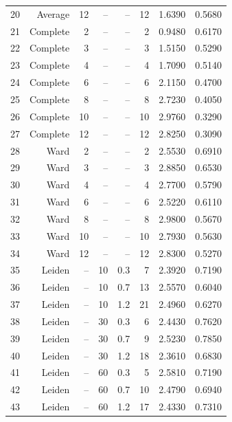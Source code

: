 \begin{longtable}{lrrrrrrr}
20 & Average & 12 & -- & -- & 12 & 1.6390 & 0.5680 \\
21 & Complete & 2 & -- & -- & 2 & 0.9480 & 0.6170 \\
22 & Complete & 3 & -- & -- & 3 & 1.5150 & 0.5290 \\
23 & Complete & 4 & -- & -- & 4 & 1.7090 & 0.5140 \\
24 & Complete & 6 & -- & -- & 6 & 2.1150 & 0.4700 \\
25 & Complete & 8 & -- & -- & 8 & 2.7230 & 0.4050 \\
26 & Complete & 10 & -- & -- & 10 & 2.9760 & 0.3290 \\
27 & Complete & 12 & -- & -- & 12 & 2.8250 & 0.3090 \\
28 & Ward & 2 & -- & -- & 2 & 2.5530 & 0.6910 \\
29 & Ward & 3 & -- & -- & 3 & 2.8850 & 0.6530 \\
30 & Ward & 4 & -- & -- & 4 & 2.7700 & 0.5790 \\
31 & Ward & 6 & -- & -- & 6 & 2.5220 & 0.6110 \\
32 & Ward & 8 & -- & -- & 8 & 2.9800 & 0.5670 \\
33 & Ward & 10 & -- & -- & 10 & 2.7930 & 0.5630 \\
34 & Ward & 12 & -- & -- & 12 & 2.8300 & 0.5270 \\
35 & Leiden & -- & 10 & 0.3 & 7 & 2.3920 & 0.7190 \\
36 & Leiden & -- & 10 & 0.7 & 13 & 2.5570 & 0.6040 \\
37 & Leiden & -- & 10 & 1.2 & 21 & 2.4960 & 0.6270 \\
38 & Leiden & -- & 30 & 0.3 & 6 & 2.4430 & 0.7620 \\
39 & Leiden & -- & 30 & 0.7 & 9 & 2.5230 & 0.7850 \\
40 & Leiden & -- & 30 & 1.2 & 18 & 2.3610 & 0.6830 \\
41 & Leiden & -- & 60 & 0.3 & 5 & 2.5810 & 0.7190 \\
42 & Leiden & -- & 60 & 0.7 & 10 & 2.4790 & 0.6940 \\
43 & Leiden & -- & 60 & 1.2 & 17 & 2.4330 & 0.7310 \\
\end{longtable}
